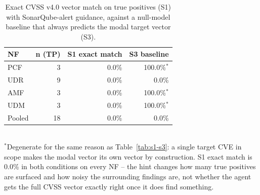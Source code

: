 \begin{table}[t]
\centering
\caption{Exact CVSS v4.0 vector match on true positives (S1) with SonarQube-alert guidance, against a null-model baseline that always predicts the modal target vector (S3).}
\label{tab:s1-s3-hint}
\begin{tabular}{lrrr}
\toprule
NF & n (TP) & S1 exact match & S3 baseline \\
\midrule
PCF & 3  & 0.0\% & 100.0\%$^{*}$ \\
UDR & 9  & 0.0\% & 0.0\%  \\
AMF & 3  & 0.0\% & 100.0\%$^{*}$ \\
UDM & 3  & 0.0\% & 100.0\%$^{*}$ \\
\midrule
Pooled & 18 & 0.0\% & 0.0\% \\
\bottomrule
\end{tabular}
\\[2pt]
\footnotesize{$^{*}$Degenerate for the same reason as Table~\ref{tab:s1-s3}: a single target CVE in scope makes the modal vector its own vector by construction. S1 exact match is 0.0\% in both conditions on every NF -- the hint changes how many true positives are surfaced and how noisy the surrounding findings are, not whether the agent gets the full CVSS vector exactly right once it does find something.}
\end{table}

